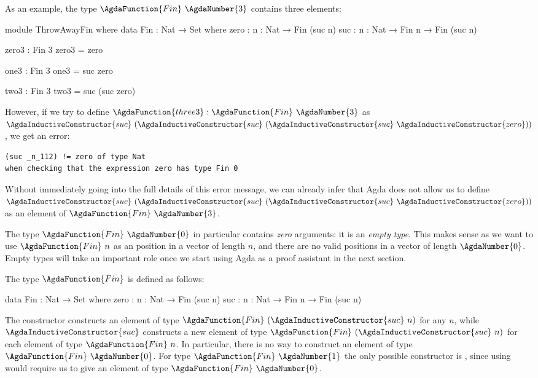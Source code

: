 \documentclass[a4paper,UKenglish]{tufte-handout}
\theoremstyle{definition}
\newcommand\fun[1]{{\AgdaFunction{#1}}}
\newcommand\data[1]{{\AgdaFunction{#1}}}
\newcommand\con[1]{{\AgdaInductiveConstructor{#1}}}
\newcommand\lit[1]{{\AgdaNumber{#1}}}
\newcommand\zero{\con{zero}}
\newcommand\suc{\con{suc}}
\newcommand\Fin{\data{Fin}}
\begin{document}
As an example, the type $\Fin\ \lit{3}$ contains three elements:
\begin{code}[hide]
module ThrowAwayFin where
  data Fin : Nat → Set where
    zero  : {n : Nat} → Fin (suc n)
    suc   : {n : Nat} → Fin n → Fin (suc n)
\end{code}
\begin{code}[number]
  zero3 : Fin 3
  zero3 = zero

  one3 : Fin 3
  one3   = suc zero

  two3 : Fin 3
  two3   = suc (suc zero)
\end{code}
However, if we try to define $\fun{three3} : \Fin\ \lit{3}$ as
$\suc\ (\suc\ (\suc\ \zero))$, we get an error:
\begin{verbatim}
(suc _n_112) != zero of type Nat
when checking that the expression zero has type Fin 0
\end{verbatim}
Without immediately going into the full details of this error message,
we can already infer that Agda does not allow us to
define $\suc\ (\suc\ (\suc\ \zero))$ as an element of $\Fin\ \lit{3}$.

The type $\Fin\ \lit{0}$ in particular
contains \emph{zero} arguments: it is an \emph{empty type}.
This makes sense as we want to use $\Fin\ n$ as an position
in a vector of length $n$, and there are no valid positions
in a vector of length $\lit{0}$. Empty types will take an important role once
we start using Agda as a proof assistant in the next section.

The type $\Fin$ is defined as follows:
\begin{code}[number]
data Fin : Nat → Set where
  zero  : {n : Nat} → Fin (suc n)
  suc   : {n : Nat} → Fin n → Fin (suc n)
\end{code}
The constructor \zero constructs
an element of type $\data{Fin}~(\suc\ n)$ for any $n$,
while $\suc$ constructs a new element of type $\data{Fin}\
(\suc\ n)$ for each element of type $\data{Fin}\ n$.
In particular, there is no way
to construct an element of type $\data{Fin}\ \lit{0}$.
For type $\Fin\ \lit{1}$ the only possible constructor is \zero, since
using \suc{} would require us to give an element of type $\Fin\ \lit{0}$.
\end{document}
